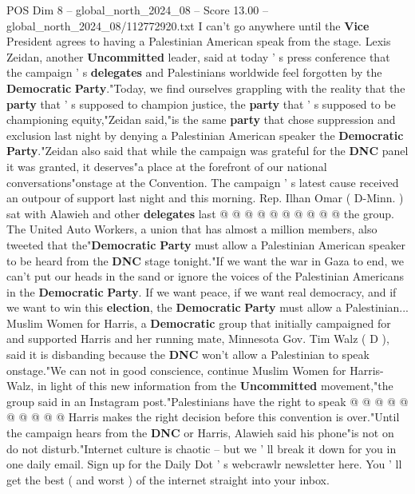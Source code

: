 \begin{textsample}{POS Dim 8 – global\_north\_2024\_08 – Score 13.00 – global\_north\_2024\_08/112772920.txt}
I can't go anywhere until the \textbf{Vice} President agrees to having a Palestinian American speak from the stage.
Lexis Zeidan, another \textbf{Uncommitted} leader, said at today ' s press conference that the campaign ' s \textbf{delegates} and Palestinians worldwide feel forgotten by the \textbf{Democratic} \textbf{Party}."Today, we find ourselves grappling with the reality that the \textbf{party} that ' s supposed to champion justice, the \textbf{party} that ' s supposed to be championing equity,"Zeidan said,"is the same \textbf{party} that chose suppression and exclusion last night by denying a Palestinian American speaker the \textbf{Democratic} \textbf{Party}."Zeidan also said that while the campaign was grateful for the \textbf{DNC} panel it was granted, it deserves"a place at the forefront of our national conversations"onstage at the Convention.
The campaign ' s latest cause received an outpour of support last night and this morning.
Rep.
Ilhan Omar ( D-Minn. ) sat with Alawieh and other \textbf{delegates} last @ @ @ @ @ @ @ @ @ @ the group.
The United Auto Workers, a union that has almost a million members, also tweeted that the"\textbf{Democratic} \textbf{Party} must allow a Palestinian American speaker to be heard from the \textbf{DNC} stage tonight."If we want the war in Gaza to end, we can't put our heads in the sand or ignore the voices of the Palestinian Americans in the \textbf{Democratic} \textbf{Party}.
If we want peace, if we want real democracy, and if we want to win this \textbf{election}, the \textbf{Democratic} \textbf{Party} must allow a Palestinian...
Muslim Women for Harris, a \textbf{Democratic} group that initially campaigned for and supported Harris and her running mate, Minnesota Gov.
Tim Walz ( D ), said it is disbanding because the \textbf{DNC} won't allow a Palestinian to speak onstage."We can not in good conscience, continue Muslim Women for Harris-Walz, in light of this new information from the \textbf{Uncommitted} movement,"the group said in an Instagram post."Palestinians have the right to speak @ @ @ @ @ @ @ @ @ @ Harris makes the right decision before this convention is over."Until the campaign hears from the \textbf{DNC} or Harris, Alawieh said his phone"is not on do not disturb."Internet culture is chaotic -- but we ' ll break it down for you in one daily email.
Sign up for the Daily Dot ' s webcrawlr newsletter here.
You ' ll get the best ( and worst ) of the internet straight into your inbox.

\end{textsample}
